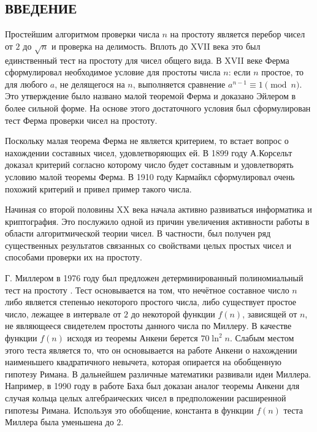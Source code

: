 \documentclass[_00_dissertation.tex]{subfiles}
\begin{document}
\onlyinsubfile{
    \renewcommand{\contentsname}{ОГЛАВЛЕНИЕ}
    \setcounter{tocdepth}{3}
    \tableofcontents
}

\newpage
\begin{center}
    \section*{ВВЕДЕНИЕ}
\end{center}

Простейшим алгоритмом проверки числа $n$ на простоту является перебор чисел от $2$ до $\sqrt{n}$ и проверка на делимость.
Вплоть до XVII века это был единственный тест на простоту для чисел общего вида.
В XVII веке Ферма сформулировал необходимое условие для простоты числа $n$: если $n$ простое, то для любого $a$, не делящегося на $n$, выполняется сравнение $a^{n-1} \equiv 1{\pmod{n}}$.
Это утверждение было названо малой теоремой Ферма и доказано Эйлером в более сильной форме.
На основе этого достаточного условия был сформулирован тест Ферма проверки чисел на простоту.

Поскольку малая теорема Ферма не является критерием, то встает вопрос о нахождении составных чисел, удовлетворяющих ей.
В 1899 году А.Корсельт доказал критерий согласно которому число будет составным и удовлетворять условию малой теоремы Ферма.
В 1910 году Кармайкл сформулировал очень похожий критерий и привел пример такого числа.

Начиная со второй половины XX века начала активно развиваться информатика и криптография.
Это послужило одной из причин увеличения активности работы в области алгоритмической теории чисел.
В частности, был получен ряд существенных результатов связанных со свойствами целых простых чисел и способами проверки их на простоту.

Г. Миллером в 1976 году был предложен детерминированный полиномиальный тест на простоту \cite{Miller}.
Тест основывается на том, что нечётное составное число $n$ либо является степенью некоторого простого числа, либо существует простое число, лежащее в интервале от $2$ до некоторой функции $f(n)$, зависящей от $n$, не являющееся свидетелем простоты данного числа по Миллеру.
В качестве функции $f(n)$ исходя из теоремы Анкени берется $70 \ln^2 n$.
Слабым местом этого теста является то, что он основывается на работе Анкени о нахождении наименьшего квадратичного невычета, которая опирается на обобщенную гипотезу Римана.
В дальнейшем различные математики развивали идеи Миллера.
Например, в 1990 году в работе Баха \cite{Bach} был доказан аналог теоремы Анкени для случая кольца целых алгебраических чисел в предположении расширенной гипотезы Римана.
Используя это обобщение, константа в функции $f(n)$ теста Миллера была уменьшена до $2$.
\end{document}
